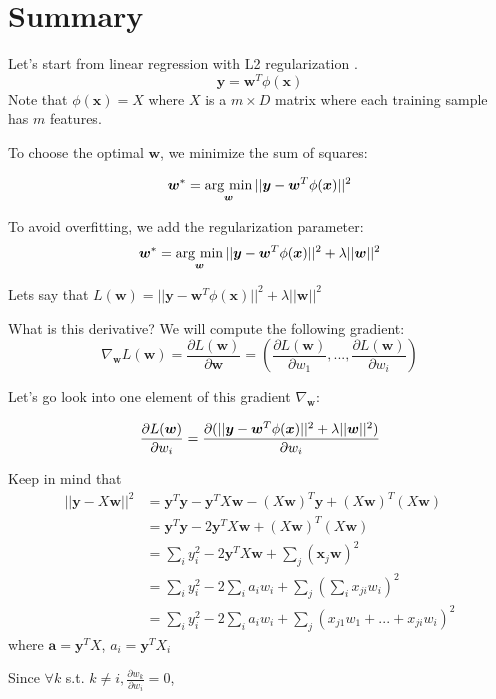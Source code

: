 \documentclass[11pt]{article}
\newcommand{\argmin}{\mathop{\rm arg~min}\limits}
\begin{document}
\section{Summary}
Let's start from linear regression with L2 regularization \cite{l2reg}.
$$
\bm{y} = \bm{w}^T \phi(\bm{x})
$$
Note that $\phi(\bm{x}) = X$ where $X$ is a $m \times D$ matrix where each training sample has $m$ features.

To choose the optimal $\bm{w}$, we minimize the sum of squares:

$$
\bm{w}^* = \argmin_{\bm{w}} ||\bm{y} - \bm{w}^T \phi(\bm{x})||^2
$$

To avoid overfitting, we add the regularization parameter: 
$$
\bm{w}^* = \argmin_{\bm{w}} ||\bm{y} - \bm{w}^T \phi(\bm{x})||^2 + \lambda ||\bm{w}||^2
$$

Lets say that $L(\bm{w}) = ||\bm{y} - \bm{w}^T \phi(\bm{x})||^2 + \lambda ||\bm{w}||^2$





What is this derivative? We will compute the following gradient:
$$
\nabla_{\bm{w}} L(\bm{w}) = \frac{\partial L(\bm{w})}{\partial \bm{w}} =  (\frac{\partial L(\bm{w})}{\partial w_1}, ..., \frac{\partial L(\bm{w})}{\partial w_i})
$$

Let's go look into one element of this gradient $\nabla_{\bm{w}}$:

$$
\frac{\partial L(\bm{w})}{\partial w_i}
 = \frac{\partial (||\bm{y} - \bm{w}^T \phi(\bm{x})||^2 + \lambda ||\bm{w}||^2)}{\partial w_i} \\
$$

Keep in mind that 
\begin{align}
||\bm{y} - X\bm{w}||^2 
&= \bm{y}^T \bm{y} - \bm{y}^T X\bm{w} - (X\bm{w})^T \bm{y} + (X\bm{w})^T(X\bm{w}) \\
&= \bm{y}^T \bm{y} - 2 \bm{y}^T X\bm{w} + (X\bm{w})^T(X\bm{w}) \\
&= \sum_i y_i^2 - 2 \bm{y}^T X\bm{w} + \sum_j (\bm{x}_j \bm{w})^2 \\
&= \sum_i y_i^2 - 2 \sum_i a_i w_i + \sum_j (\sum_i x_{ji} w_i)^2 \\
&= \sum_i y_i^2 - 2 \sum_i a_i w_i + \sum_j (x_{j1} w_1 + ... + x_{ji} w_i )^2
\end{align}
where $\bm{a} = \bm{y}^T X$, $a_i = \bm{y}^T X_i$

Since $\forall k$ s.t. $k \neq i, \frac{\partial w_k}{\partial w_i} = 0$, 
\end{document}
